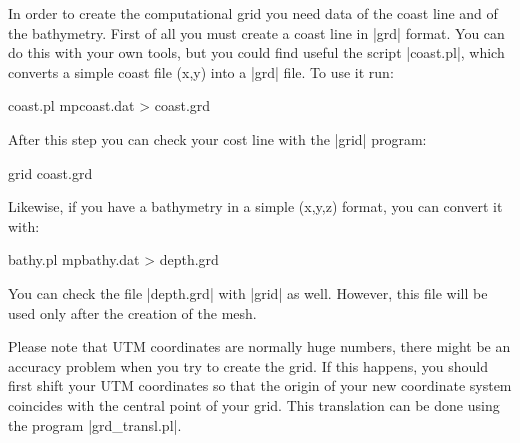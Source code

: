 
%
%
%
%
%
%
%

In order to create the computational grid you need data of the coast line
and of the bathymetry.
First of all you must create a coast line in |grd| format. You can do
this with your own tools, but you could find useful the script
|coast.pl|, which converts a simple coast file (x,y) into a |grd| file.
To use it run:

\begin{code}
    coast.pl mpcoast.dat > coast.grd
\end{code}

After this step you can check your cost line with the |grid| program:

\begin{code}
    grid coast.grd
\end{code}

Likewise, if you have a bathymetry in a simple (x,y,z) format, you can
convert it with:

\begin{code}
    bathy.pl mpbathy.dat > depth.grd
\end{code}

You can check the file |depth.grd| with |grid| as well. However, this file 
will be used only after the creation of the mesh.

Please note that UTM coordinates are normally huge numbers, there
might be an accuracy problem when you try to create the grid. If this
happens, you should first shift your UTM coordinates so that the origin
of your new coordinate system coincides with the central point of your
grid. This translation can be done using the program |grd_transl.pl|.

